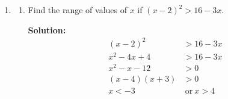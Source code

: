 \documentclass{report}
\newcommand{\sol}{\textbf{Solution:}}
\begin{document}
\begin{enumerate}[leftmargin=*]
\begin{enumerate}
                    \newpage
              \item Point $P$ moves such that its distance from point $A$ is always 5 units. Find
                    the equation of the locus of point $P$.

                    \sol{}

                    The locus of point $P$ is a circle with centre $(2, 4)$ and radius 5.
                    \begin{align*}
                        (x-2)^2 + (y-4)^2            & = 5^2 \\
                        x^2 - 4x + 4 + y^2 - 8y + 16 & = 25  \\
                        x^2 + y^2 - 4x - 8y - 5      & = 0
                    \end{align*}

              \item Determine whether point $(2,6)$ lies in the locus of point $P$.

                    \sol{}
                    When $x=2$ and $y=6$,
                    \begin{align*}
                        2^2 + 6^2 - 4(2) - 8(6) - 5 & = 4 + 36 - 8 - 48 - 5 \\
                                                    & = -21 \neq 0
                    \end{align*}
                    Therefore, point $(2,6)$ does not lie in the locus of point $P$.
          \end{enumerate}
    \item \begin{enumerate}
              \item Find the range of values of $x$ if $(x-2)^2>16-3 x$.

                    \sol{}
                    \begin{align*}
                        (x-2)^2         & > 16-3x            \\
                        x^2-4x+4        & > 16-3x            \\
                        x^2-x-12        & > 0                \\
                        (x-4)(x+3)      & > 0                \\
                        x          < -3 & \ \text{or}\ x > 4
                    \end{align*}


\end{enumerate}
\end{enumerate}
\end{document}
